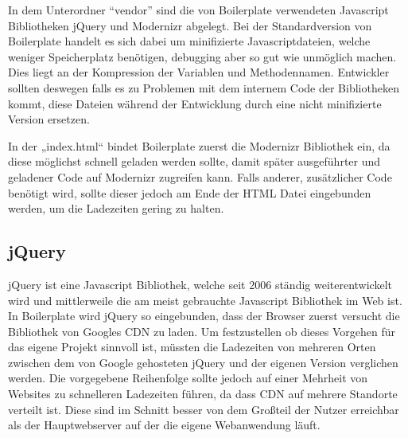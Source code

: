 \documentclass[12pt,journal,compsoc]{IEEEtran}
\begin{document}
In dem Unterordner “vendor” sind die von Boilerplate verwendeten Javascript Bibliotheken jQuery und Modernizr abgelegt.
Bei der Standardversion von Boilerplate handelt es sich dabei um minifizierte Javascriptdateien, welche weniger Speicherplatz benötigen,
debugging aber so gut wie unmöglich machen. Dies liegt an der Kompression der Variablen und Methodennamen. Entwickler sollten deswegen
falls es zu Problemen mit dem internem Code der Bibliotheken kommt, diese Dateien während der Entwicklung durch eine nicht minifizierte Version ersetzen.



In der „index.html“ bindet Boilerplate zuerst die Modernizr Bibliothek ein, da diese möglichst schnell geladen werden sollte,
damit später ausgeführter und geladener Code auf Modernizr zugreifen kann. Falls anderer, zusätzlicher Code benötigt wird, sollte dieser jedoch am Ende
der HTML Datei eingebunden werden, um die Ladezeiten gering zu halten.

\subsection{jQuery}

jQuery ist eine Javascript Bibliothek, welche seit 2006 ständig weiterentwickelt wird und mittlerweile die am meist gebrauchte Javascript Bibliothek im Web ist\cite{market}.
In Boilerplate wird jQuery so eingebunden, dass der Browser zuerst versucht die Bibliothek von Googles CDN zu laden.
Um festzustellen ob dieses Vorgehen für das eigene Projekt sinnvoll ist, müssten die Ladezeiten von mehreren Orten zwischen dem von Google gehosteten jQuery und der eigenen Version verglichen werden.
Die vorgegebene Reihenfolge sollte jedoch auf einer Mehrheit von Websites zu schnelleren Ladezeiten führen,
da dass CDN auf mehrere Standorte verteilt ist. Diese sind im Schnitt besser von dem Großteil der Nutzer erreichbar als der Hauptwebserver auf der die eigene Webanwendung läuft.
\end{document}
